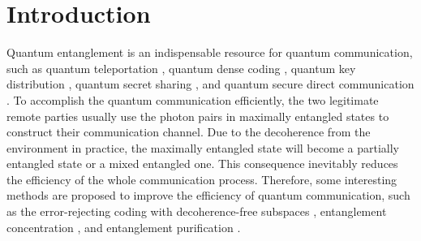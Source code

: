\documentclass[showpacs,aps,graphicx,twocolumn]{revtex4}
\begin{document}
 \maketitle





\section{Introduction}\label{sec1}


Quantum entanglement is an indispensable resource for quantum
communication, such as quantum teleportation \cite{CHBennet1993},
quantum dense coding \cite{CHBennet1992,superdense}, quantum key
distribution \cite{AKEkert,bbm92,lixhqkdpra}, quantum secret sharing
\cite{MHillery}, and quantum secure direct communication
\cite{longliupra,FGDeng2003,QSDCWangC,twostepexp}. To
accomplish the quantum communication efficiently,  the two
legitimate remote parties usually use the  photon pairs in maximally
entangled states to construct their communication channel. Due to
the decoherence from the environment in practice, the maximally
entangled state will become a partially entangled state or a mixed
entangled one. This consequence inevitably reduces the efficiency of
the whole communication process. Therefore, some interesting methods
are proposed to improve the efficiency of quantum communication,
such as the error-rejecting coding with decoherence-free subspaces
\cite{DFS1,DFS2,DFS3}, entanglement concentration
\cite{CHBennett1996,YBSheng2008,BCRen012302,Lixhpraecp,HZhangPRA2017},
and entanglement purification
\cite{EPP1,DDeutschPRL1996,JWPannature2001,Simon2002,JWPannature2003,YBShengPRA2008,
EPP2,EPP3,EPP4,dengonestep,EPP5,GYWangPRA2016,CWangECPPRA11,EPPadd1,EPPadd2}.
\end{document}
